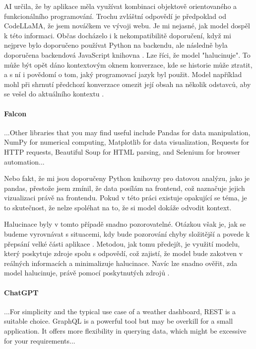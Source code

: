 \documentclass[FM,DP]{tulthesis}
\begin{document}
		AI určila, že by aplikace měla využívat kombinaci objektově orientovaného a funkcionálního programování. Trochu zvláštní odpovědí je předpoklad od CodeLLaMA, že jsem nováčkem ve vývoji webu. Je mi nejasné, jak model dospěl k této informaci. Občas docházelo i k nekompatibilitě doporučení, když mi nejprve bylo doporučeno používat Python na backendu, ale následně byla doporučena backendová JavaScript knihovna \cite{codellama_navrh} \cite{bingCopilot_navrh}. Lze říci, že model "halucinuje". To může být opět dáno kontextovým oknem konverzace, kde se historie může ztratit, a s ní i povědomí o tom, jaký programovací jazyk byl použit. Model například mohl při shrnutí předchozí konverzace omezit její obsah na několik odstavců, aby se vešel do aktuálního kontextu \cite{compressing}.
		
		\vspace{0.6em}
		\begin{tcolorbox}[colback=white,colframe=black]
			\paragraph{Falcon}
			...Other libraries that you may find useful include Pandas for data manipulation, NumPy for numerical computing, Matplotlib for data visualization, Requests for HTTP requests, Beautiful Soup for HTML parsing, and Selenium for browser automation... \cite{falcon_navrh}
		\end{tcolorbox}
		\vspace{0.6em}
		
		Nebo fakt, že mi jsou doporučeny Python knihovny pro datovou analýzu, jako je pandas, přestože jsem zmínil, že data posílám na frontend, což naznačuje jejich vizualizaci právě na frontendu. Pokud v této práci existuje opakující se téma, je to skutečnost, že nelze spoléhat na to, že si model dokáže odvodit kontext.
		
		Halucinace byly v tomto případě snadno pozorovatelné. Otázkou však je, jak se budeme vyrovnávat s situacemi, kdy bude pozorování chyby složitější a povede k přepsání velké části aplikace \cite{codellama_navrh}. Metodou, jak tomu předejít, je využití modelu, který poskytuje zdroje spolu s odpovědí, což zajistí, že model bude zakotven v reálných informacích a minimalizuje halucinace. Navíc lze snadno ověřit, zda model halucinuje, právě pomocí poskytnutých zdrojů \cite{PEG} \cite{perplexity}.
		
		\vspace{0.6em}
		\begin{tcolorbox}[colback=white,colframe=black]
			\paragraph{ChatGPT}
			...For simplicity and the typical use case of a weather dashboard, REST is a suitable choice. GraphQL is a powerful tool but may be overkill for a small application. It offers more flexibility in querying data, which might be excessive for your requirements... \cite{chatgpt_navrh}
		\end{tcolorbox}
		\vspace{0.6em}
		
\end{document}
